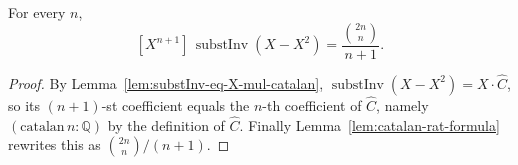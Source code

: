\begin{theorem}
    \label{thm:substInv-catalan}
    \leanok
    For every $n$,
    \[
      [X^{n+1}]\,\operatorname{substInv}(X - X^2) = \frac{\binom{2n}{n}}{n+1}.
    \]
\end{theorem}
\begin{proof}
    By Lemma~\ref{lem:substInv-eq-X-mul-catalan}, $\operatorname{substInv}(X - X^2) = X \cdot \hat C$,
    so its $(n+1)$-st coefficient equals the $n$-th coefficient of $\hat C$, namely
    $(\mathrm{catalan}\,n : \mathbb{Q})$ by the definition of $\hat C$. Finally
    Lemma~\ref{lem:catalan-rat-formula} rewrites this as $\binom{2n}{n}/(n+1)$.
\end{proof}


